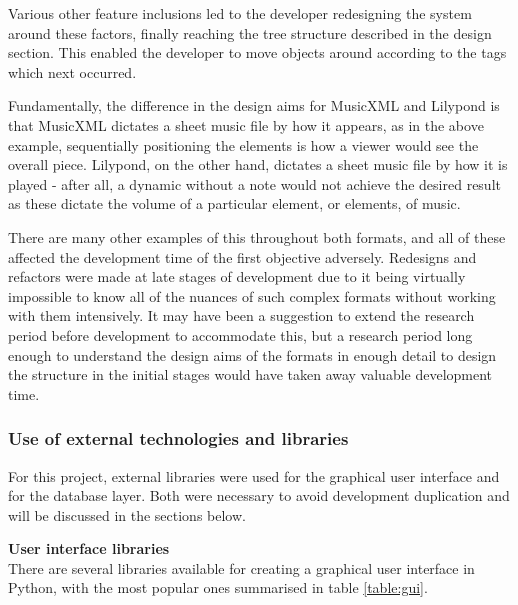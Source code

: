 Various other feature inclusions led to the developer redesigning the system around these factors, finally reaching the tree structure described in the design section. This enabled the developer to move objects around according to the tags which next occurred.

Fundamentally, the difference in the design aims for MusicXML and Lilypond is that MusicXML dictates a sheet music file by how it appears, as in the above example, sequentially positioning the elements is how a viewer would see the overall piece. Lilypond, on the other hand, dictates a sheet music file by how it is played - after all, a dynamic without a note would not achieve the desired result as these dictate the volume of a particular element, or elements, of music. 

There are many other examples of this throughout both formats, and all of these affected the development time of the first objective adversely. Redesigns and refactors were made at late stages of development due to it being virtually impossible to know all of the nuances of such complex formats without working with them intensively. It may have been a suggestion to extend the research period before development to accommodate this, but a research period long enough to understand the design aims of the formats in enough detail to design the structure in the initial stages would have taken away valuable development time.

\subsubsection{Use of external technologies and libraries}
For this project, external libraries were used for the graphical user interface and for the database layer. Both were necessary to avoid development duplication and will be discussed in the sections below.

\textbf{User interface libraries} \\
There are several libraries available for creating a graphical user interface in Python, with the most popular ones summarised in table \ref{table:gui}.

